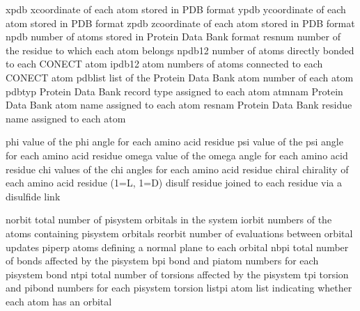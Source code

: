 \documentclass[letterpaper,11pt,english]{sphinxmanual}
\begin{document}

\begin{sphinxVerbatim}[commandchars=\\\{\}]
xpdb            x\PYGZhy{}coordinate of each atom stored in PDB format
ypdb            y\PYGZhy{}coordinate of each atom stored in PDB format
zpdb            z\PYGZhy{}coordinate of each atom stored in PDB format
npdb            number of atoms stored in Protein Data Bank format
resnum          number of the residue to which each atom belongs
npdb12          number of atoms directly bonded to each CONECT atom
ipdb12          atom numbers of atoms connected to each CONECT atom
pdblist         list of the Protein Data Bank atom number of each atom
pdbtyp          Protein Data Bank record type assigned to each atom
atmnam          Protein Data Bank atom name assigned to each atom
resnam          Protein Data Bank residue name assigned to each atom
\end{sphinxVerbatim}


\begin{sphinxVerbatim}[commandchars=\\\{\}]
phi             value of the phi angle for each amino acid residue
psi             value of the psi angle for each amino acid residue
omega           value of the omega angle for each amino acid residue
chi             values of the chi angles for each amino acid residue
chiral          chirality of each amino acid residue (1=L, \PYGZhy{}1=D)
disulf          residue joined to each residue via a disulfide link
\end{sphinxVerbatim}


\begin{sphinxVerbatim}[commandchars=\\\{\}]
norbit          total number of pisystem orbitals in the system
iorbit          numbers of the atoms containing pisystem orbitals
reorbit         number of evaluations between orbital updates
piperp          atoms defining a normal plane to each orbital
nbpi            total number of bonds affected by the pisystem
bpi             bond and piatom numbers for each pisystem bond
ntpi            total number of torsions affected by the pisystem
tpi             torsion and pibond numbers for each pisystem torsion
listpi          atom list indicating whether each atom has an orbital
\end{sphinxVerbatim}
\end{document}
